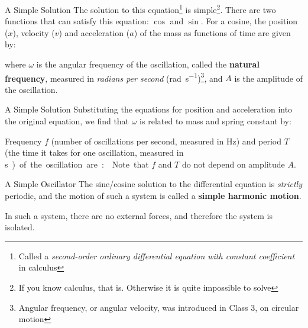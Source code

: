 \documentclass[12pt,compress,aspectratio=169]{beamer}
\begin{document}
\begin{frame}{A Simple Solution}
  The solution to this equation\footnote{Called a \emph{second-order ordinary
  differential equation with constant coefficient} in calculus} is
  simple\footnote{If you know calculus, that is. Otherwise it is quite
  impossible to solve}. There are two functions that can satisfy this equation: 
  $\cos$ and $\sin$. For a cosine, the position ($x$), velocity ($v$) and
  acceleration ($a$) of the mass as functions of time are given by:
 
  \vspace{-.3in}{\large
    \begin{align*}
      x(t)&=A\cos(\omega t)\\
      v(t)&=-A\omega\sin(\omega t)\\
      a(t)&=-A\omega^2\cos(\omega t)
    \end{align*}
    }

  where $\omega$ is the angular frequency of the oscillation, called the
  \textbf{natural frequency}, measured in \emph{radians per second}
  (\si{rad\per\second})\footnote{Angular frequency, or angular velocity,
  was introduced in Class 3, on circular motion}, and $A$ is the amplitude of
  the oscillation.
\end{frame}



\begin{frame}{A Simple Solution}
  Substituting the equations for position and acceleration into the original
  equation, we find that $\omega$ is related to mass and spring constant by:


  
  Frequency $f$ (number of oscillations per second, measured in \si{\hertz})
  and period $T$ (the time it takes for one oscillation, measured in
  \si\second) of the oscillation are:%


  Note that $f$ and $T$ do not depend on amplitude $A$.
\end{frame}


\begin{frame}{A Simple Oscillator}
  The sine/cosine solution to the differential equation is \emph{strictly}
  periodic, and the motion of such a system is called a
  \textbf{simple harmonic motion}.

  \vspace{-.3in}{\large
    \begin{align*}
      x(t)&=A\cos(\omega t)\\
      v(t)&=-A\omega\sin(\omega t)\\
      a(t)&=-A\omega^2\cos(\omega t)
    \end{align*}
    }

  In such a system, there are no external forces, and therefore the system is
  isolated.
\end{frame}
\end{document}
